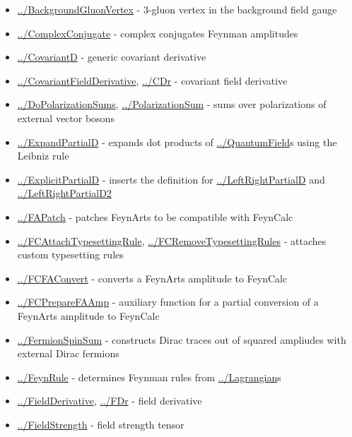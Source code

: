 \documentclass[../FeynCalcManual.tex]{subfiles}
\begin{document}
\begin{itemize}
\tightlist
\item
  \hyperlink{../backgroundgluonvertex}{../BackgroundGluonVertex} -
  \(3\)-gluon vertex in the background field gauge
\item
  \hyperlink{../complexconjugate}{../ComplexConjugate} - complex
  conjugates Feynman amplitudes
\item
  \hyperlink{../covariantd}{../CovariantD} - generic covariant
  derivative
\item
  \hyperlink{../covariantfieldderivative}{../CovariantFieldDerivative},
  \hyperlink{../cdr}{../CDr} - covariant field derivative
\item
  \hyperlink{../dopolarizationsums}{../DoPolarizationSums},
  \hyperlink{../polarizationsum}{../PolarizationSum} - sums over
  polarizations of external vector bosons
\item
  \hyperlink{../expandpartiald}{../ExpandPartialD} - expands dot
  products of \hyperlink{../quantumfield}{../QuantumField}s using the
  Leibniz rule
\item
  \hyperlink{../explicitpartiald}{../ExplicitPartialD} - inserts the
  definition for \hyperlink{../leftrightpartiald}{../LeftRightPartialD}
  and \hyperlink{../leftrightpartiald2}{../LeftRightPartialD2}
\item
  \hyperlink{../fapatch}{../FAPatch} - patches FeynArts to be compatible
  with FeynCalc
\item
  \hyperlink{../fcattachtypesettingrule}{../FCAttachTypesettingRule},
  \hyperlink{../fcremovetypesettingrules}{../FCRemoveTypesettingRules} -
  attaches custom typesetting rules
\item
  \hyperlink{../fcfaconvert}{../FCFAConvert} - converts a FeynArts
  amplitude to FeynCalc
\item
  \hyperlink{../fcpreparefaamp}{../FCPrepareFAAmp} - auxiliary function
  for a partial conversion of a FeynArts amplitude to FeynCalc
\item
  \hyperlink{../fermionspinsum}{../FermionSpinSum} - constructs Dirac
  traces out of squared ampliudes with external Dirac fermions
\item
  \hyperlink{../feynrule}{../FeynRule} - determines Feynman rules from
  \hyperlink{../lagrangian}{../Lagrangian}s
\item
  \hyperlink{../fieldderivative}{../FieldDerivative},
  \hyperlink{../fdr}{../FDr} - field derivative
\item
  \hyperlink{../fieldstrength}{../FieldStrength} - field strength tensor

\end{itemize}
\end{document}
